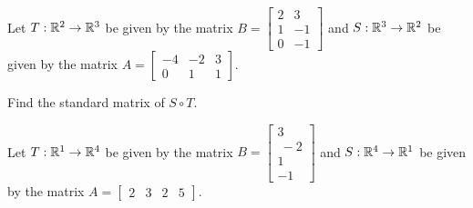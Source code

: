 \begin{applicationActivities}{1}{21}
%

\begin{activity}{10}
Let $T: \mathbb{R}^2 \rightarrow \mathbb{R}^3$ be given by the matrix $B=\begin{bmatrix} 2 & 3 \\ 1 & -1 \\ 0 & -1 \end{bmatrix}$ and $S: \mathbb{R}^3 \rightarrow \mathbb{R}^2$ be given by the matrix $A=\begin{bmatrix} -4 & -2 & 3 \\ 0 & 1 & 1 \end{bmatrix}$.

Find the standard matrix of $S \circ T$.
\end{activity}

%

\begin{activity}{5}
Let $T: \mathbb{R}^1 \rightarrow \mathbb{R}^4$ be given by the matrix $B=\begin{bmatrix} 3 \\\ -2 \\ 1 \\ -1\end{bmatrix}$ and $S: \mathbb{R}^4 \rightarrow \mathbb{R}^1$ be given by the matrix $A=\begin{bmatrix}2 & 3 & 2 & 5 \end{bmatrix}$.


\end{activity}
\end{applicationActivities}
